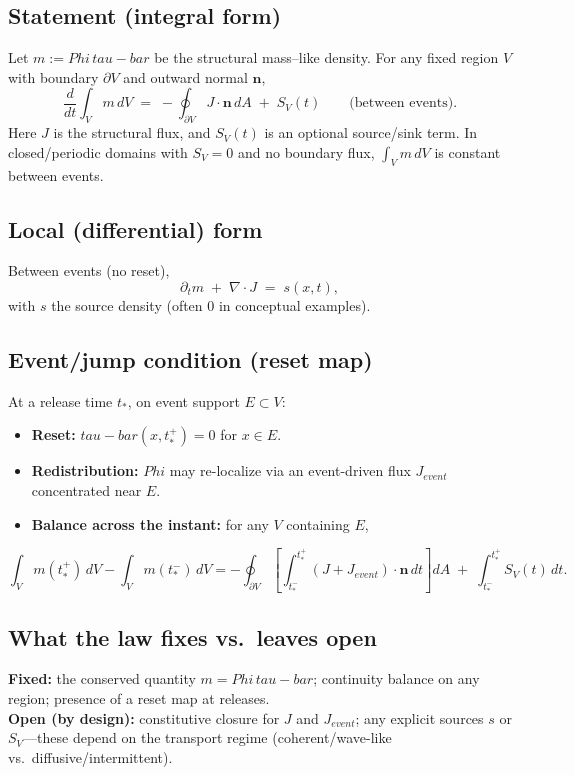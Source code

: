 \documentclass[12pt]{article}
\newcommand{\FoldDensity}{\Phi}
\newcommand{\FoldTime}{\bar{\tau}}
\def\FoldDensity{Phi}%
\def\FoldTime{tau-bar}%
\def\bar#1{#1}%
\def\mathrm#1{#1}%
\begin{document}
\subsection[Statement (integral form)]{Statement (integral form)}
Let $m := \FoldDensity\,\FoldTime$ be the structural mass--like density. For any fixed region $V$ with boundary $\partial V$ and outward normal $\mathbf{n}$,
\begin{equation*}
\frac{d}{dt}\int_V m\,dV \;=\; - \oint_{\partial V} J \cdot \mathbf{n}\, dA \;+\; S_V(t)
\qquad\text{(between events).}
\end{equation*}
Here $J$ is the structural flux, and $S_V(t)$ is an optional source/sink term. In closed/periodic domains with $S_V=0$ and no boundary flux, $\int_V m\,dV$ is constant between events.

\subsection[Local (differential) form]{Local (differential) form}
Between events (no reset),
\begin{equation*}
\partial_t m \;+\; \nabla\!\cdot\! J \;=\; s(x,t),
\end{equation*}
with $s$ the source density (often $0$ in conceptual examples).

\subsection[Event/jump condition (reset map)]{Event/jump condition (reset map)}
At a release time $t_\ast$, on event support $E\subset V$:
\begin{itemize}
  \item \textbf{Reset:} $\FoldTime(x,t_\ast^{+}) = 0$ for $x\in E$.
  \item \textbf{Redistribution:} $\FoldDensity$ may re-localize via an event-driven flux $J_{\mathrm{event}}$ concentrated near $E$.
  \item \textbf{Balance across the instant:} for any $V$ containing $E$,
\end{itemize}
\begin{equation*}
\int_V m(t_\ast^{+})\,dV - \int_V m(t_\ast^{-})\,dV
= - \oint_{\partial V} \!\!\left[\int_{t_\ast^{-}}^{t_\ast^{+}} (J + J_{\mathrm{event}})\!\cdot\!\mathbf{n}\, dt\right] dA
\;+\; \int_{t_\ast^{-}}^{t_\ast^{+}} \! S_V(t)\, dt .
\end{equation*}

\subsection[What the law fixes vs.\ leaves open]{What the law fixes vs.\ leaves open}
\textbf{Fixed:} the conserved quantity $m=\FoldDensity\,\FoldTime$; continuity balance on any region; presence of a reset map at releases.\\
\textbf{Open (by design):} constitutive closure for $J$ and $J_{\mathrm{event}}$; any explicit sources $s$ or $S_V$—these depend on the transport regime (coherent/wave-like vs.\ diffusive/intermittent).
\end{document}
